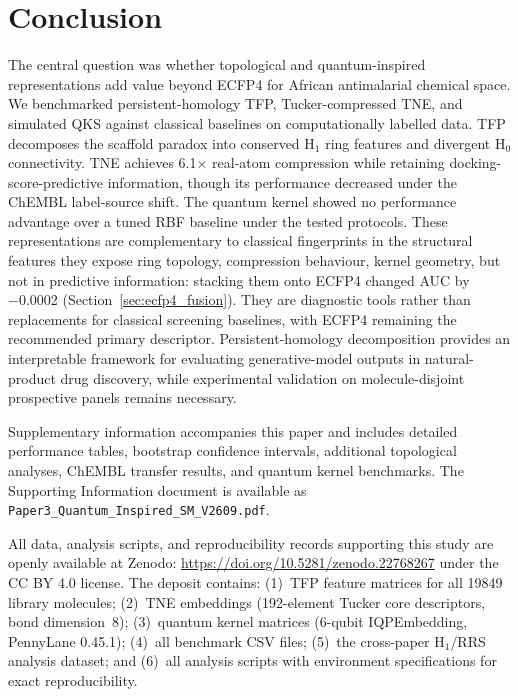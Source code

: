 \documentclass[pdflatex,sn-mathphys-num]{sn-jnl}%
\begin{document}

\section{Conclusion}\label{sec:conclusion}

The central question was whether topological and quantum-inspired representations add value beyond ECFP4 for African antimalarial chemical space. We benchmarked persistent-homology TFP, Tucker-compressed TNE, and simulated QKS against classical baselines on computationally labelled data. TFP decomposes the scaffold paradox into conserved H$_1$ ring features and divergent H$_0$ connectivity. TNE achieves \num{6.1}$\times$ real-atom compression while retaining docking-score-predictive information, though its performance decreased under the ChEMBL label-source shift. The quantum kernel showed no performance advantage over a tuned RBF baseline under the tested protocols. These representations are complementary to classical fingerprints in the structural features they expose ring topology, compression behaviour, kernel geometry, but not in predictive information: stacking them onto ECFP4 changed AUC by \num{-0.0002} (Section~\ref{sec:ecfp4_fusion}). They are diagnostic tools rather than replacements for classical screening baselines, with ECFP4 remaining the recommended primary descriptor. Persistent-homology decomposition provides an interpretable framework for evaluating generative-model outputs in natural-product drug discovery, while experimental validation on molecule-disjoint prospective panels remains necessary.

\backmatter


Supplementary information accompanies this paper and includes detailed performance tables, bootstrap confidence intervals, additional topological analyses, ChEMBL transfer results, and quantum kernel benchmarks. The Supporting Information document is available as \texttt{Paper3\_Quantum\_Inspired\_SM\_V2609.pdf}.


All data, analysis scripts, and reproducibility records supporting this study are openly available at Zenodo: \url{https://doi.org/10.5281/zenodo.22768267} under the CC BY 4.0 license. The deposit contains: (1)~TFP feature matrices for all \num{19849} library molecules; (2)~TNE embeddings (\num{192}-element Tucker core descriptors, bond dimension~8); (3)~quantum kernel matrices (6-qubit IQPEmbedding, PennyLane 0.45.1); (4)~all benchmark CSV files; (5)~the cross-paper H$_1$/RRS analysis dataset; and (6)~all analysis scripts with environment specifications for exact reproducibility.
\end{document}
